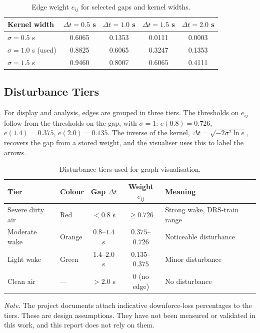 \documentclass[11pt,a4paper]{article}
\newcommand{\dt}{\Delta t}
\begin{document}
\begin{table}[H]
\centering
\caption{Edge weight $e_{ij}$ for selected gaps and kernel widths.}
\label{tab:sigma}
\small
\begin{tabular}{@{}lcccc@{}}
\toprule
\textbf{Kernel width} & $\dt=0.5$ s & $\dt=1.0$ s & $\dt=1.5$ s & $\dt=2.0$ s \\
\midrule
$\sigma = 0.5$ s & 0.6065 & 0.1353 & 0.0111 & 0.0003 \\
$\sigma = 1.0$ s (used) & 0.8825 & 0.6065 & 0.3247 & 0.1353 \\
$\sigma = 1.5$ s & 0.9460 & 0.8007 & 0.6065 & 0.4111 \\
\bottomrule
\end{tabular}
\end{table}

\subsection{Disturbance Tiers}
For display and analysis, edges are grouped in three tiers. The thresholds on
$e_{ij}$ follow from the thresholds on the gap, with $\sigma=1$:
$e(0.8)=0.726$, $e(1.4)=0.375$, $e(2.0)=0.135$. The inverse of the kernel,
$\dt = \sqrt{-2\sigma^2\ln e}$, recovers the gap from a stored weight, and the
visualiser uses this to label the arrows.

\begin{table}[H]
\centering
\caption{Disturbance tiers used for graph visualisation.}
\label{tab:tiers}
\small
\begin{tabularx}{\linewidth}{@{}l l c c X@{}}
\toprule
\textbf{Tier} & \textbf{Colour} & \textbf{Gap $\Delta t$} & \textbf{Weight $e_{ij}$} & \textbf{Meaning} \\
\midrule
Severe dirty air & \cellcolor{f1red!35}Red    & $<0.8$ s         & $\ge 0.726$        & Strong wake, DRS-train range \\
Moderate wake    & \cellcolor{f1orange!35}Orange & $0.8$--$1.4$ s & $0.375$--$0.726$   & Noticeable disturbance \\
Light wake       & \cellcolor{f1green!35}Green & $1.4$--$2.0$ s  & $0.135$--$0.375$   & Minor disturbance \\
Clean air        & ---    & $>2.0$ s         & $0$ (no edge)      & No disturbance \\
\bottomrule
\end{tabularx}
\end{table}
\noindent\emph{Note.} The project documents attach indicative downforce-loss
percentages to the tiers. These are design assumptions. They have not been
measured or validated in this work, and this report does not rely on them.
\end{document}
